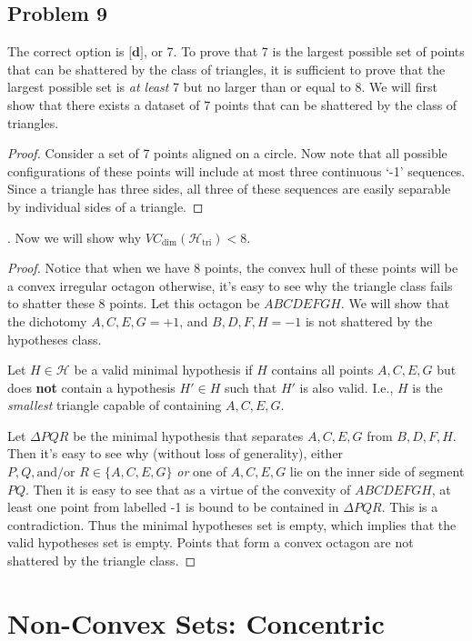 \documentclass{article}
\begin{document}
\subsection*{Problem 9}
The correct option is $\textbf{[d]}$, or 7. To prove that 7 is the largest possible set of points that can be shattered by the class of triangles, it is sufficient to prove that the largest possible set is \emph{at least} 7 but no larger than or equal to 8. We will first show that there exists a dataset of 7 points that can be shattered by the class of triangles. 
\begin{proof}
    Consider a set of 7 points aligned on a circle. Now note that all possible configurations of these points will include at most three continuous `-1' sequences. Since a triangle has three sides, all three of these sequences are easily separable by individual sides of a triangle. 
\end{proof}
. Now we will show why $VC_{\text{dim}}(\mathcal{H}_{\text{tri}}) < 8$.
\begin{proof}
Notice that when we have 8 points, the convex hull of these points will be a convex irregular octagon otherwise, it's easy to see why the triangle class fails to shatter these 8 points. Let this octagon be $ABCDEFGH$. We will show that the dichotomy $A, C, E, G = +1$, and $B, D, F, H = -1$ is not shattered by the hypotheses class. 
\begin{definition}
    Let $H \in \mathcal{H}$ be a valid minimal hypothesis if $H$ contains all points $A, C, E, G$ but does \textbf{not} contain a hypothesis $H' \in H$ such that $H'$ is also valid. I.e., $H$ is the \emph{smallest} triangle capable of containing $A, C, E, G$. 
\end{definition}
Let $\Delta PQR$ be the minimal hypothesis that separates $A,C,E,G$ from $B, D, F, H$. Then it's easy to see why (without loss of generality), either $P, Q, \text{and/or } R \in \{A,C,E,G\}$ \emph{or} one of $A, C, E, G$ lie on the inner side of segment $PQ$. Then it is easy to see that as a virtue of the convexity of $ABCDEFGH$, at least one point from labelled -1 is bound to be contained in $\Delta PQR$. This is a contradiction. Thus the minimal hypotheses set is empty, which implies that the valid hypotheses set is empty. Points that form a convex octagon are not shattered by the triangle class.
\end{proof}
\section*{Non-Convex Sets: Concentric}
\end{document}
